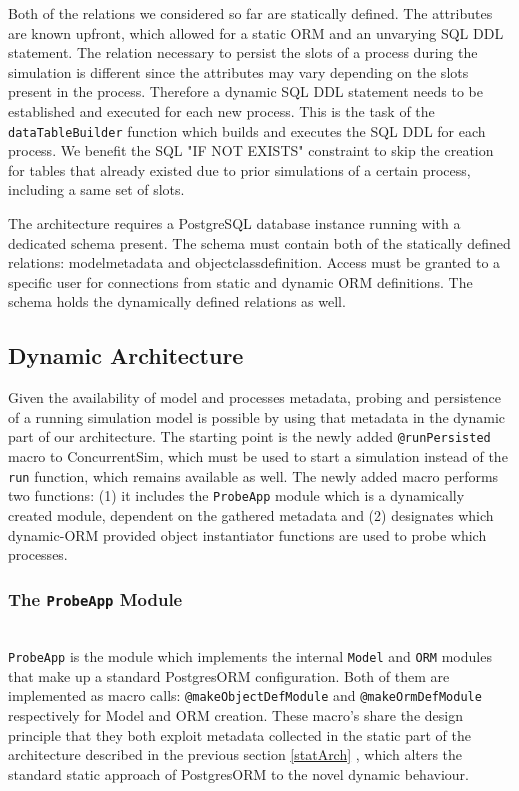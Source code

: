 \documentclass{juliacon}
\begin{document}
Both of the relations we considered so far are statically defined. The attributes are known upfront, which allowed for a static ORM and an unvarying SQL DDL statement. The relation necessary to persist the slots of a process during the simulation is different since the attributes may vary depending on the slots present in the process. Therefore a dynamic SQL DDL statement needs to be established and executed for each new process. This is the task of the \texttt{dataTableBuilder} function which builds and executes the SQL DDL for each process. We benefit the SQL "IF NOT EXISTS" constraint to skip the creation for tables that already existed due to prior simulations of a certain process, including a same set of slots. \vskip 6pt

The architecture requires a PostgreSQL database instance running with a dedicated schema present. The schema must contain both of the statically defined relations: modelmetadata and objectclassdefinition. Access must be granted to a specific user for connections from static and dynamic ORM definitions. The schema holds the dynamically defined relations as well. \vskip 6pt

\subsection{Dynamic Architecture}

Given the availability of model and processes metadata, probing and persistence of a running simulation model is possible by using that metadata in the dynamic part of our architecture. The starting point is the newly added \texttt{@runPersisted} macro to ConcurrentSim, which must be used to start a simulation  instead of the \texttt{run} function, which remains available as well. The newly added macro performs two functions: (1) it includes the \texttt{ProbeApp} module which is a dynamically created module, dependent on the gathered metadata and (2) designates which dynamic-ORM provided object instantiator functions are used to probe which processes. \vskip 6pt

\subsubsection{The \textnormal{\texttt{ProbeApp}} Module}\hfill\\

\texttt{ProbeApp} is the module which implements the internal \texttt{Model} and \texttt{ORM} modules that make up a standard PostgresORM configuration. Both of them are implemented as macro calls: \texttt{@makeObjectDefModule} and \texttt{@makeOrmDefModule} respectively for Model and ORM creation. These macro's share the design principle that they both exploit metadata collected in the static part of the architecture described in the previous section \ref{statArch} , which alters the standard static approach of PostgresORM to the novel dynamic behaviour.\vskip 6pt
\end{document}
